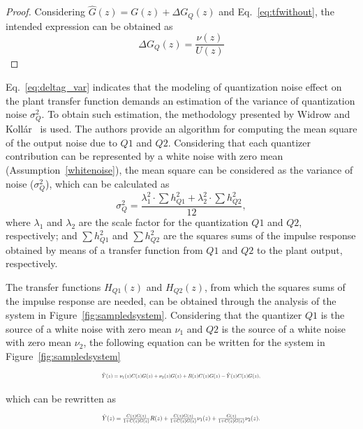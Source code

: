 \documentclass{sig-alternate-05-2015}
\begin{document}
\begin{proof}
Considering $\hat{G}(z)=G(z)+\Delta{G_{Q}(z)}$ and Eq.~\eqref{eq:tfwithout},
the intended expression can be obtained as
%
\begin{equation}
\Delta{G_{Q}(z)}=\frac{\nu(z)}{U(z)} 
\end{equation}
\end{proof}

Eq.~\eqref{eq:deltag_var} indicates that the modeling of quantization noise
effect on the plant transfer function demands an estimation of the variance
of quantization noise $\sigma_{Q}^{2}$.  To obtain such estimation, the
methodology presented by Widrow and Koll\'ar~\cite{widrow2008quantization}
is used.  The authors provide an algorithm for computing the mean square of
the output noise due to $Q1$ and $Q2$.  Considering that each quantizer
contribution can be represented by a white noise with zero mean
(Assumption~\ref{whitenoise}), the mean square can be considered as the
variance of noise ($\sigma_{Q}^{2}$), which can be calculated as
%
\begin{equation}
\sigma_{Q}^{2}=\frac{\lambda_{1}^{2}\cdot \sum {h_{Q1}^{2}}+\lambda_{2}^{2}\cdot \sum {h_{Q2}^{2}}}{12},
\end{equation}
%
\noindent where $\lambda_{1}$ and $\lambda_{2}$ are the scale factor for the
quantization $Q1$ and $Q2$, respectively; and $\sum {h_{Q1}^{2}}$ and $\sum
{h_{Q2}^{2}}$ are the squares sums of the impulse response obtained by means
of a transfer function from $Q1$ and $Q2$ to the plant output, respectively.

The transfer functions $H_{Q1}(z)$ and $H_{Q2}(z)$, from which the squares
sums of the impulse response are needed, can be obtained through the
analysis of the system in Figure~\ref{fig:sampledsystem}.  Considering that
the quantizer $Q1$ is the source of a white noise with zero mean $\nu_{1}$
and $Q2$ is the source of a white noise with zero mean $\nu_{2}$, the
following equation can be written for the system in
Figure~\ref{fig:sampledsystem}
%
\begin{equation}
\resizebox{0.48\textwidth}{!}{
$\hat{Y}(z)=\nu_{1}(z)C(z)G(z)+\nu_{2}(z)G(z)+R(z)C(z)G(z)-\hat{Y}(z)C(z)G(z),$
}
\end{equation}

\noindent which can be rewritten as
%
\begin{equation}
\label{eq:outputfunctions}
\resizebox{0.48\textwidth}{!}{
$\hat{Y}(z)=\frac{C(z)G(z)}{1+C(z)G(z)}R(z)+\frac{C(z)G(z)}{1+C(z)G(z)}\nu_{1}(z) \\
+\frac{G(z)}{1+C(z)G(z)}\nu_{2}(z).$
}
\end{equation}
\end{document}
